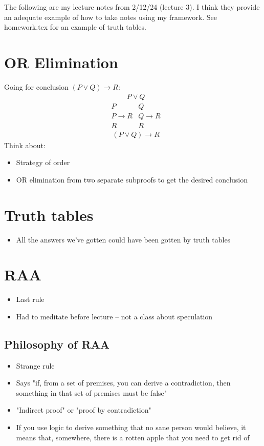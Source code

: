 \documentclass[12pt,letterpaper]{phi201}
\begin{document}
    


\noindent The following are my lecture notes from 2/12/24 (lecture 3). I think they provide an adequate example of how to take notes using my framework. See homework.tex for an example of truth tables.

\section{OR Elimination}
Going for conclusion $(P \lor Q) \to R$:
\begin{align*}
& P \lor Q
\end{align*}
\begin{align*}
& P & Q \\
& P \to R & Q \to R \\
& R & R
\end{align*}
\begin{align*}
& (P \lor Q) \to R
\end{align*}
Think about:
\begin{itemize}
    \item Strategy of order
    \item OR elimination from two separate subproofs to get the desired conclusion
\end{itemize}

\section{Truth tables}
\begin{itemize}
    \item All the answers we've gotten could have been gotten by truth tables
\end{itemize}

\section{RAA}
\begin{itemize}
    \item Last rule
    \item Had to meditate before lecture -- not a class about speculation
\end{itemize}
\subsection{Philosophy of RAA}
\begin{itemize}
    \item Strange rule
    \item Says "if, from a set of premises, you can derive a contradiction, then something in that set of premises must be false"
    \item "Indirect proof" or "proof by contradiction"
    \item If you use logic to derive something that no sane person would believe, it means that, somewhere, there is a rotten apple that you need to get rid of
\end{itemize}
\end{document}
